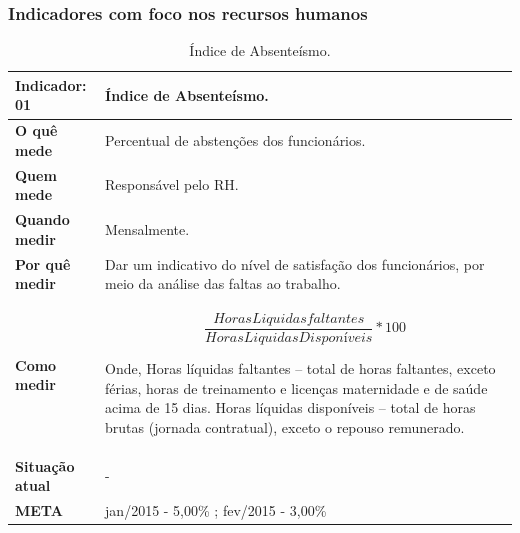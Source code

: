 \subsubsection{Indicadores com foco nos recursos humanos}
\begin{table}[H]
\caption{Índice de Absenteísmo.}
\centering
\begin{tabular}{ | p{3cm} | p{9cm}| }
\hline
\textbf{Indicador: 01} & Índice de Absenteísmo.\\ \hline
\textbf{O quê mede} & Percentual de abstenções dos funcionários. \\ \hline
\textbf{Quem mede} & Responsável pelo RH. \\ \hline
\textbf{Quando medir} & Mensalmente. \\ \hline
\textbf{Por quê medir} & Dar um indicativo do nível de satisfação dos funcionários, por meio da análise das faltas ao trabalho. \\ \hline
\textbf{Como medir} & 
\begin{center}
\begin{equation}
\frac{Horas Liquidas faltantes}{Horas Liquidas Disponíveis}*100
\end{equation}
\end{center}
Onde,
Horas líquidas faltantes – total de horas faltantes, exceto férias, horas de treinamento e licenças maternidade e de saúde acima de 15 dias.
Horas líquidas disponíveis – total de horas brutas (jornada contratual), exceto o repouso remunerado.
 \\ \hline
\textbf{Situação atual} & - \\ \hline
\textbf{META} & jan/2015 - 5,00\% ; fev/2015 - 3,00\% \\ \hline
\end{tabular}
\end{table}

